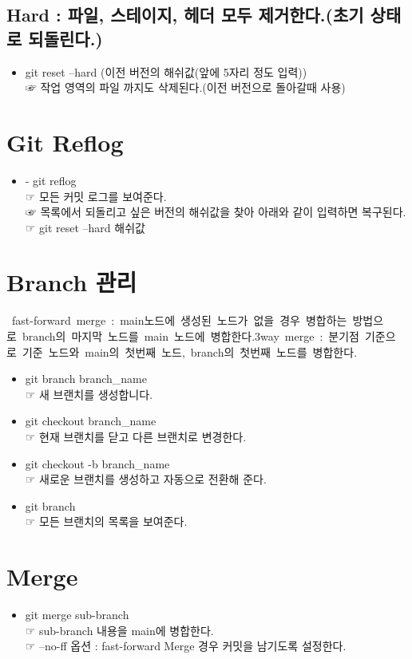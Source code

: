 \documentclass[12pt,a4paper]{oblivoir}
\begin{document}
\subsection{Hard : 파일, 스테이지, 헤더 모두 제거한다.(초기 상태로 되돌린다.)}
\begin{itemize}
\item git reset --hard (이전 버전의 해쉬값(앞에 5자리 정도 입력)) \\  ☞ 작업 영역의 파일 까지도 삭제된다.(이전 버전으로 돌아갈때 사용)
\end{itemize}

\section[Git Reflog]{Git Reflog}
\begin{itemize}
\item - git reflog \\ ☞ 모든 커밋 로그를 보여준다. \\  ☞ 목록에서 되돌리고 싶은 버전의 해쉬값을 찾아 아래와 같이 입력하면 복구된다. \\  ☞ git reset --hard 해쉬값
\end{itemize}

\section[Branch 관리]{Branch 관리}
\hbox{
fast-forward merge : main노드에 생성된 노드가 없을 경우 병합하는 방법으로 branch의 마지막 노드를 main 노드에 병합한다.\\ 
3way merge : 분기점 기준으로 기준 노드와 main의 첫번째 노드, branch의 첫번째 노드를 병합한다.\\
}

\begin{itemize}
\item git branch branch\_name \\  ☞ 새 브랜치를 생성합니다.
\item git checkout branch\_name \\  ☞ 현재 브랜치를 닫고 다른 브랜치로 변경한다.
\item git checkout -b branch\_name \\  ☞ 새로운 브랜치를 생성하고 자동으로 전환해 준다.
\item git branch \\  ☞ 모든 브랜치의 목록을 보여준다.
\end{itemize}

\section[Merge]{Merge}
\begin{itemize}
\item git merge sub-branch \\  ☞ sub-branch 내용을 main에 병합한다. \\  ☞ --no-ff 옵션 : fast-forward Merge 경우 커밋을 남기도록 설정한다.
\end{itemize}
\end{document}
